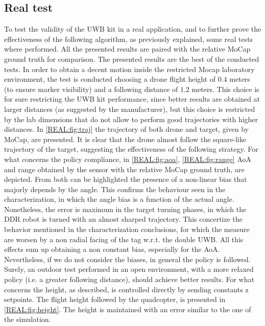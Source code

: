 \subsection{Real test}
To test the validity of the UWB kit in a real application, and to further prove the effectiveness of the following algorithm, as previously explained, some real tests where performed. All the presented results are paired with the relative MoCap ground truth for comparison. The presented results are the best of the conducted tests. In order to obtain a decent motion inside the restricted Mocap laboratory environment, the test is conducted choosing a drone flight height of $0.4$ meters (to ensure marker visibility) and a following distance of $1.2$ meters. This choice is for sure restricting the UWB kit performance, since better results are obtained at larger distances (as suggested by the manufacturer), but this choice is restricted by the lab dimensions that do not allow to perform good trajectories with higher distances. In \autoref{REAL:fig:traj} the trajectory of both drone and target, given by MoCap, are presented. It is clear that the drone almost follow the square-like trajectory of the target, suggesting the effectiveness of the following strategy. For what concerns the policy compliance, in \autoref{REAL:fig:aoa}, \ref{REAL:fig:range} AoA and range obtained by the sensor with the relative MoCap ground truth, are depicted. From both can be highlighted the presence of a non-linear bias that majorly depends by the angle. This confirms the behaviour seen in the characterization, in which the angle bias is a function of the actual angle. Nonetheless, the error is maximum in the target turning phases, in which the DDR robot is turned with an almost sharped trajectory. This concertize the behavior mentioned in the characterization conclusions, for which the measure are worsen by a non radial facing of the tag w.r.t. the double UWB. All this effects sum up obtaining a non constant bias, especially for the AoA. Nevertheless, if we do not consider the biases, in general the policy is followed. Surely, an outdoor test performed in an open environment, with a more relaxed policy (i.e. a greater following distance), should achieve better results. For what concerns the height, as described, is controlled directly by sending constants z setpoints. The flight height followed by the quadcopter, is presented in \autoref{REAL:fig:height}. The height is maintained with an error similar to the one of the simulation.\\

